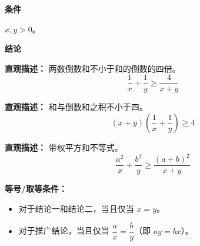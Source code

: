 \begin{statementbox}

\textbf{\textcolor{CStatement}{条件}}
\begin{description}[style=nextline, leftmargin=2.8em, labelsep=0.5em, itemsep=0.35em]
    \item[\textbf{\textcolor{CStatement}{条件 1（正数条件）：}}] $x, y > 0$。
\end{description}

\textbf{\textcolor{CStatement}{结论}}
\begin{description}[style=nextline, leftmargin=2.8em, labelsep=0.5em, itemsep=0.45em]
    \item[\textbf{\textcolor{CStatement}{结论一（倒数和不等式）：}}]
    \textbf{\textcolor{CStatement}{直观描述：}} 两数倒数和不小于和的倒数的四倍。
    \[
    \frac{1}{x} + \frac{1}{y} \geq \frac{4}{x+y}
    \]
    \item[\textbf{\textcolor{CStatement}{结论二（和积不等式）：}}]
    \textbf{\textcolor{CStatement}{直观描述：}} 和与倒数和之积不小于四。
    \[
    (x+y)\left(\frac{1}{x}+\frac{1}{y}\right) \geq 4
    \]
    \item[\textbf{\textcolor{CStatement}{推广结论（权方和形式）：}}]
    \textbf{\textcolor{CStatement}{直观描述：}} 带权平方和不等式。
    \[
    \frac{a^2}{x} + \frac{b^2}{y} \geq \frac{(a+b)^2}{x+y}
    \]
\end{description}

\textbf{\textcolor{CStatement}{等号/取等条件：}}
\begin{itemize}[leftmargin=*, itemsep=0.35em, topsep=0.3em]
    \item 对于结论一和结论二，当且仅当 $x = y$。
    \item 对于推广结论，当且仅当 $\dfrac{a}{x} = \dfrac{b}{y}$（即 $ay = bx$）。
\end{itemize}
\end{statementbox}
